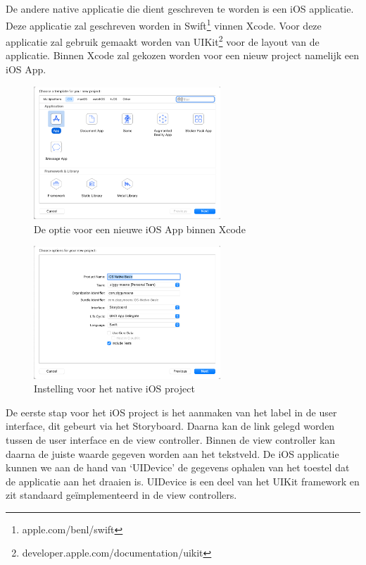 \subsection{}
\label{sec:M-first-native-ios}
De andere native applicatie die dient geschreven te worden is een iOS applicatie. Deze applicatie zal geschreven worden in Swift\footnote{apple.com/benl/swift} vinnen Xcode. Voor deze applicatie zal gebruik gemaakt worden van UIKit\footnote{developer.apple.com/documentation/uikit} voor de layout van de applicatie. Binnen Xcode zal gekozen worden voor een nieuw project namelijk een iOS App.

\begin{figure}
    \centering
    \includegraphics[width=7cm]{img/ios-basic-start.png}
    \caption{De optie voor een nieuwe iOS App binnen Xcode}
    \label{fig:M-basic-ios-start}
\end{figure}

\begin{figure}
    \centering
    \includegraphics[width=7cm]{img/ios-basic-settings.png}
    \caption{Instelling voor het native iOS project}
    \label{fig:M-basic-ios-settings}
\end{figure}

De eerste stap voor het iOS project is het aanmaken van het label in de user interface, dit gebeurt via het Storyboard. Daarna kan de link gelegd worden tussen de user interface en de view controller. Binnen de view controller kan daarna de juiste waarde gegeven worden aan het tekstveld. De iOS applicatie kunnen we aan de hand van `UIDevice' de gegevens ophalen van het toestel dat de applicatie aan het draaien is. UIDevice is een deel van het UIKit framework en zit standaard geïmplementeerd in de view controllers.

